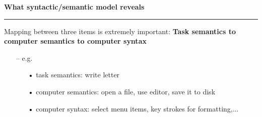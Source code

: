 \documentclass[pdf]{beamer}
\begin{document}
\begin{frame}
\vspace{8mm}
\textcolor{myBlue}{\textbf{\Large{What syntactic/semantic model reveals}}}

\textcolor{red}{\rule{10cm}{1mm}}

\begin{small}

Mapping between three items is extremely important: \textbf{Task semantics to computer semantics to computer syntax}

\begin{itemize}
\item [\textcolor{black}{--}] e.g.
     \begin{itemize}
     \item [\textcolor{black}{•}]task semantics: 	write letter
     \item [\textcolor{black}{•}]computer semantics: 	open a file, use editor, save it to disk
     \item [\textcolor{black}{•}]computer syntax: 	select menu items, key strokes for formatting,...
     \newline
     \end{itemize}
\end{itemize}
\end{small}
\end{frame}
\end{document}
